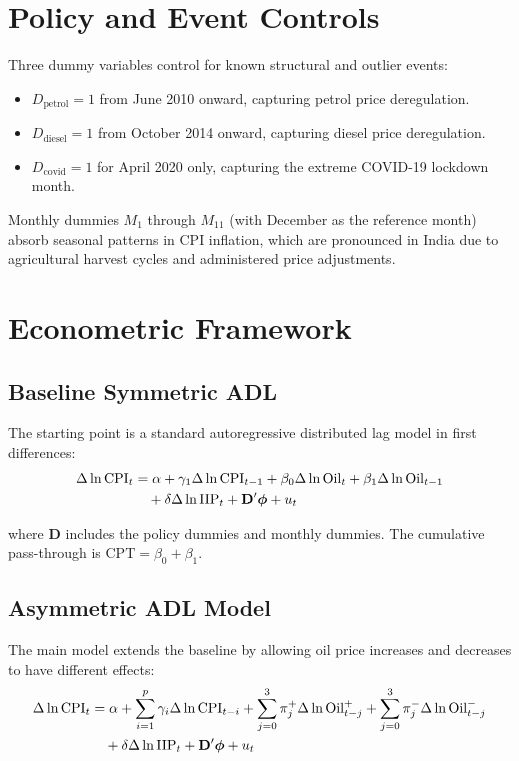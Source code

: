 \section{Policy and Event Controls}

Three dummy variables control for known structural and outlier events:

\begin{itemize}
\item $D_{\text{petrol}} = 1$ from June 2010 onward, capturing petrol price deregulation.
\item $D_{\text{diesel}} = 1$ from October 2014 onward, capturing diesel price deregulation.
\item $D_{\text{covid}} = 1$ for April 2020 only, capturing the extreme COVID-19 lockdown month.
\end{itemize}

Monthly dummies $M_1$ through $M_{11}$ (with December as the reference month) absorb seasonal patterns in CPI inflation, which are pronounced in India due to agricultural harvest cycles and administered price adjustments.

\section{Econometric Framework}

\subsection{Baseline Symmetric ADL}

The starting point is a standard autoregressive distributed lag model in first differences:
\begin{align}
\Delta \ln \text{CPI}_t &= \alpha + \gamma_1 \Delta \ln \text{CPI}_{t-1}
  + \beta_0 \Delta \ln \text{Oil}_t + \beta_1 \Delta \ln \text{Oil}_{t-1} \notag \\
  &\quad + \delta \Delta \ln \text{IIP}_t + \mathbf{D}'\boldsymbol{\phi} + u_t
\label{eq:symmetric}
\end{align}

where $\mathbf{D}$ includes the policy dummies and monthly dummies. The cumulative pass-through is $\text{CPT} = \beta_0 + \beta_1$.

\subsection{Asymmetric ADL Model}

The main model extends the baseline by allowing oil price increases and decreases to have different effects:
\begin{align}
\Delta \ln \text{CPI}_t &= \alpha + \sum_{i=1}^{p} \gamma_i \Delta \ln \text{CPI}_{t-i}
  + \sum_{j=0}^{3} \pi^+_j \Delta \ln \text{Oil}^+_{t-j}
  + \sum_{j=0}^{3} \pi^-_j \Delta \ln \text{Oil}^-_{t-j} \notag \\
  &\quad + \delta \Delta \ln \text{IIP}_t + \mathbf{D}'\boldsymbol{\phi} + u_t
\label{eq:asymmetric}
\end{align}

